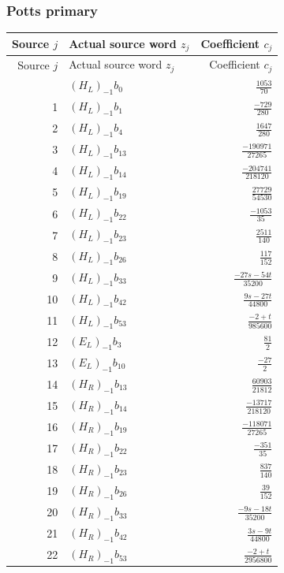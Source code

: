 \subsubsection{Potts primary}
\begingroup\footnotesize\renewcommand{\arraystretch}{1.55}
\begin{longtable}{@{}rlr@{}}
\toprule Source $j$&Actual source word $z_j$&Coefficient $c_j$\\\midrule\endfirsthead
\toprule Source $j$&Actual source word $z_j$&Coefficient $c_j$\\\midrule\endhead
\bottomrule\endfoot
0 & $(H_L)_{-1}b_{0}$ & $\frac{1053}{70}$\\
1 & $(H_L)_{-1}b_{1}$ & $\frac{-729}{280}$\\
2 & $(H_L)_{-1}b_{4}$ & $\frac{1647}{280}$\\
3 & $(H_L)_{-1}b_{13}$ & $\frac{-190971}{27265}$\\
4 & $(H_L)_{-1}b_{14}$ & $\frac{-204741}{218120}$\\
5 & $(H_L)_{-1}b_{19}$ & $\frac{27729}{54530}$\\
6 & $(H_L)_{-1}b_{22}$ & $\frac{-1053}{35}$\\
7 & $(H_L)_{-1}b_{23}$ & $\frac{2511}{140}$\\
8 & $(H_L)_{-1}b_{26}$ & $\frac{117}{152}$\\
9 & $(H_L)_{-1}b_{33}$ & $\frac{-27s-54t}{35200}$\\
10 & $(H_L)_{-1}b_{42}$ & $\frac{9s-27t}{44800}$\\
11 & $(H_L)_{-1}b_{53}$ & $\frac{-2+t}{985600}$\\
12 & $(E_L)_{-1}b_{3}$ & $\frac{81}{2}$\\
13 & $(E_L)_{-1}b_{10}$ & $\frac{-27}{2}$\\
14 & $(H_R)_{-1}b_{13}$ & $\frac{60903}{21812}$\\
15 & $(H_R)_{-1}b_{14}$ & $\frac{-13717}{218120}$\\
16 & $(H_R)_{-1}b_{19}$ & $\frac{-118071}{27265}$\\
17 & $(H_R)_{-1}b_{22}$ & $\frac{-351}{35}$\\
18 & $(H_R)_{-1}b_{23}$ & $\frac{837}{140}$\\
19 & $(H_R)_{-1}b_{26}$ & $\frac{39}{152}$\\
20 & $(H_R)_{-1}b_{33}$ & $\frac{-9s-18t}{35200}$\\
21 & $(H_R)_{-1}b_{42}$ & $\frac{3s-9t}{44800}$\\
22 & $(H_R)_{-1}b_{53}$ & $\frac{-2+t}{2956800}$\\

\end{longtable}
